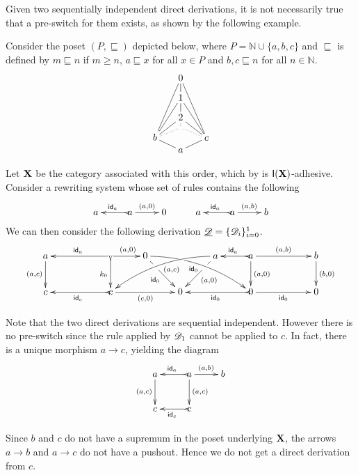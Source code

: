 Given two sequentially independent direct derivations, it is not necessarily true that a pre-switch for them exists, as shown by the following example. 

\begin{example}\label{ex:diff1}
	Consider the poset $(P, \sqsubseteq)$ depicted below, where
	$P = \mathbb{N} \cup \{a,b,c\}$ and $\sqsubseteq$ is defined by
	$m \sqsubseteq n$ if $m \geq n$, $a \sqsubseteq x$ for all $x \in P$
	and $b, c \sqsubseteq n$ for all $n \in \mathbb{N}$.
	\[\xymatrix@C=16pt@R=1pt{
		& 0 \ar@{-}[dd] \ar@{-}[ddddddl] \ar@{-}[ddddddr] &  \\
		&  & \\
		& 1 \ar@{-}[dd] \ar@{-}[ddddl]  \ar@{-}[ddddr]   &  \\
		&  & \\
		& 2 \ar@{.}[d] \ar@{-}[ddl]   \ar@{-}[ddr]     &  \\
		&  \ar@{.}[dl]   \ar@{.}[dr] & \\
		b \ar@{-}[dr] & & c \ar@{-}[dl]\\
		& a} \]
		
	Let $\textbf {\textup{X}}$ be the  
	category associated with this order, which by  is
	$\mathsf{I(\textbf {\textup{X}})}$-adhesive. Consider a rewriting
	system whose set of rules contains the following 
	\[\xymatrix{a & a \ar[r]^{(a,0)} \ar@{>->}[l]_{\id{a}} & 0 & a & a
		\ar[r]^{(a,b)} \ar@{>->}[l]_{\id{a}} & b }\]
	We can then consider the  following derivation
	$\underline{\mathscr{D}}=\{\mathscr{D}_i\}_{i=0}^1$.
	 \[
   \xymatrix@C=25pt{a \ar[d]_{(a,c)}&& \ar@{>->}[d]_{k_0}\ar[ll]_{\id{a}}
		    \ar[r]^{(a,0)} & 0 \ar@/^.35cm/[drrr]|(.315)\hole_(.45){\id{0}}
		    \ar[dr]|(.3)\hole_{\id{0}} && a \ar@/_.35cm/[dlll]^(.45){\hspace{5pt}(a,c)}
		     \ar[dl]|(.3)\hole^{(a,0)}& a \ar[d]^{(a,0)}\ar@{>->}[l]_{\id{a}}
		     \ar[rr]^{(a,b)} && b \ar[d]^{(b,0)}\\c &&
		     \ar@{>->}[ll]^{\id{c}} c \ar[rr]_{(c,0)}&& 0 &&
		     \ar@{>->}[ll]^{\id{0}} 0 \ar[rr]_{\id{0}}&& 0}\]

	Note that the two direct derivations are sequential
	independent. However there is no pre-switch since the rule applied by
	$\mathscr{D}_1$ cannot be applied to $c$. In fact, there is a unique morphism
	$a\to c$, yielding the diagram
	\[	\xymatrix{a \ar[d]_{(a,c)}& a
		\ar[d]^{(a,c)}\ar@{>->}[l]_{\id{a}} \ar[r]^{(a,b)}& b \\c & c
		\ar@{>->}[l]^{\id{c}}
	}\]
	
	Since $b$ and $c$ do not have a supremum in the poset underlying $\textbf {\textup{X}}$, the arrows
	$a\to b$ and $a\to c$ do not have a pushout. Hence we do not get a direct derivation from $c$.
\end{example}

